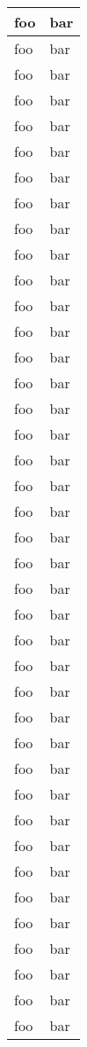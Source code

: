 \newpage
\begin{longtable}{| p{} | p{} |} 
	\hline
	foo & bar \\ \hline 
	foo & bar \\ \hline
	foo & bar \\ \hline
	foo & bar \\ \hline
	foo & bar \\ \hline
	foo & bar \\ \hline
	foo & bar \\ \hline
	foo & bar \\ \hline
	foo & bar \\ \hline
	foo & bar \\ \hline
	foo & bar \\ \hline
		foo & bar \\ \hline
	foo & bar \\ \hline
	foo & bar \\ \hline
	foo & bar \\ \hline
	foo & bar \\ \hline
	foo & bar \\ \hline
	foo & bar \\ \hline
		foo & bar \\ \hline
	foo & bar \\ \hline
	foo & bar \\ \hline
	foo & bar \\ \hline
	foo & bar \\ \hline
	foo & bar \\ \hline
	foo & bar \\ \hline
		foo & bar \\ \hline
	foo & bar \\ \hline
	foo & bar \\ \hline
	foo & bar \\ \hline
	foo & bar \\ \hline
	foo & bar \\ \hline
	foo & bar \\ \hline
		foo & bar \\ \hline
	foo & bar \\ \hline
	foo & bar \\ \hline
	foo & bar \\ \hline
	foo & bar \\ \hline
	foo & bar \\ \hline
	foo & bar \\ \hline
		foo & bar \\ \hline

\end{longtable}
